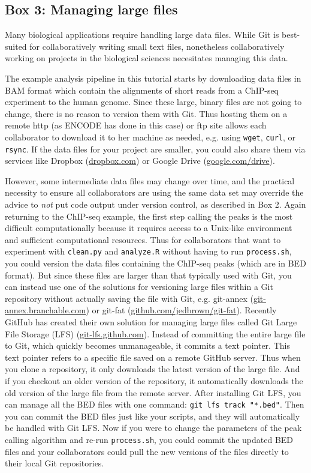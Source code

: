 \subsection*{Box 3: Managing large files}

Many biological applications require handling large data files.
While Git is best-suited for collaboratively writing small text files, nonetheless collaboratively working on projects in the biological sciences necesitates managing this data.

The example analysis pipeline in this tutorial starts by downloading data files in BAM format which contain the alignments of short reads from a ChIP-seq experiment to the human genome.
Since these large, binary files are not going to change, there is no reason to version them with Git.
Thus hosting them on a remote http (as ENCODE has done in this case) or ftp site allows each collaborator to download it to her machine as needed, e.g. using \verb|wget|, \verb|curl|, or \verb|rsync|.
If the data files for your project are smaller, you could also share them via services like Dropbox (\href{www.dropbox.com}{dropbox.com}) or Google Drive (\href{https://www.google.com/drive/}{google.com/drive}).

However, some intermediate data files may change over time, and the practical necessity to ensure all collaborators are using the same data set may override the advice to \textit{not} put code output under version control, as described in Box 2.
Again returning to the ChIP-seq example, the first step calling the peaks is the most difficult computationally because it requires access to a Unix-like environment and sufficient computational resources.
Thus for collaborators that want to experiment with \verb|clean.py| and \verb|analyze.R| without having to run \verb|process.sh|, you could version the data files containing the ChIP-seq peaks (which are in BED format).
But since these files are larger than that typically used with Git, you can instead use one of the solutions for versioning large files within a Git repository without actually saving the file with Git, e.g. git-annex (\href{https://git-annex.branchable.com/}{git-annex.branchable.com}) or git-fat (\href{https://github.com/jedbrown/git-fat/}{github.com/jedbrown/git-fat}).
Recently GitHub has created their own solution for managing large files called Git Large File Storage (LFS) (\href{https://git-lfs.github.com/}{git-lfs.github.com}).
Instead of committing the entire large file to Git, which quickly becomes unmanageable, it commits a text pointer.
This text pointer refers to a specific file saved on a remote GitHub server.
Thus when you clone a repository, it only downloads the latest version of the large file.
And if you checkout an older version of the repository, it automatically downloads the old version of the large file from the remote server.
After installing Git LFS, you can manage all the BED files with one command: \verb|git lfs track "*.bed"|.
Then you can commit the BED files just like your scripts, and they will automatically be handled with Git LFS.
Now if you were to change the parameters of the peak calling algorithm and re-run \verb|process.sh|, you could commit the updated BED files and your collaborators could pull the new versions of the files directly to their local Git repositories.
